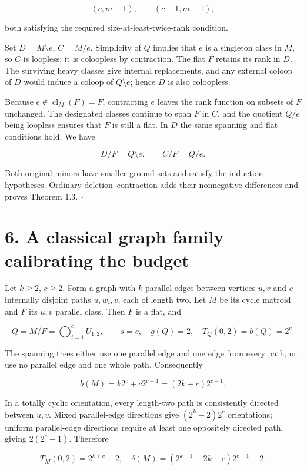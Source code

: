 \documentclass[11pt]{article}
\begin{document}
\[
(c,m-1),\qquad(c-1,m-1),
\]

both satisfying the required size-at-least-twice-rank condition.

Set \(D=M\setminus e\), \(C=M/e\). Simplicity of \(Q\) implies that \(e\) is a singleton class in \(M\), so \(C\) is loopless; it is coloopless by contraction. The flat \(F\) retains its rank in \(D\). The surviving heavy classes give internal replacements, and any external coloop of \(D\) would induce a coloop of \(Q\setminus e\); hence \(D\) is also coloopless.

Because \(e\notin\operatorname{cl}_M(F)=F\), contracting \(e\) leaves the rank function on subsets of \(F\) unchanged. The designated classes continue to span \(F\) in \(C\), and the quotient \(Q/e\) being loopless ensures that \(F\) is still a flat. In \(D\) the same spanning and flat conditions hold. We have

\[
D/F=Q\setminus e,\qquad C/F=Q/e.
\]

Both original minors have smaller ground sets and satisfy the induction hypotheses. Ordinary deletion--contraction adds their nonnegative differences and proves Theorem 1.3. \hfill\(\square\)

\section*{6. A classical graph family calibrating the budget}

Let \(k\ge2\), \(c\ge2\). Form a graph with \(k\) parallel edges between vertices \(u,v\) and \(c\) internally disjoint paths \(u,w_i,v\), each of length two. Let \(M\) be its cycle matroid and \(F\) its \(u,v\) parallel class. Then \(F\) is a flat, and

\[
Q=M/F=\bigoplus_{i=1}^{c}U_{1,2},\qquad s=c,\quad g(Q)=2,
\quad T_Q(0,2)=b(Q)=2^c.
\]

The spanning trees either use one parallel edge and one edge from every path, or use no parallel edge and one whole path. Consequently

\[
b(M)=k2^c+c2^{c-1}=(2k+c)2^{c-1}. \tag{18}
\]

In a totally cyclic orientation, every length-two path is consistently directed between \(u,v\). Mixed parallel-edge directions give \((2^k-2)2^c\) orientations; uniform parallel-edge directions require at least one oppositely directed path, giving \(2(2^c-1)\). Therefore

\[
T_M(0,2)=2^{k+c}-2,
\quad \delta(M)=(2^{k+1}-2k-c)2^{c-1}-2. \tag{19}
\]
\end{document}
